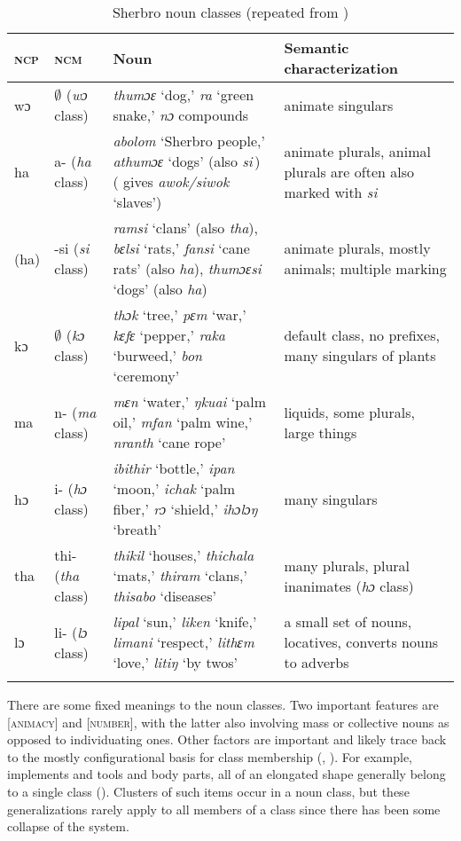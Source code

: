 \begin{table}
\caption{\label{tab:nounclass:31}Sherbro noun classes (repeated from )}
\small
\begin{tabularx}{\textwidth}{llQQ}
\lsptoprule
\textsc{ncp} & \textsc{ncm} & Noun & Semantic characterization\\
\midrule
 wɔ & $\emptyset$ (\textit{wɔ} class) & \textit{thumɔɛ} ‘dog,' \textit{ra} ‘green snake,' \textit{nɔ} compounds & animate singulars\\
 ha & a- (\textit{ha} class) & \textit{abolom} ‘Sherbro people,' \textit{athumɔɛ} ‘dogs' (also \textit{si}\,) (\citet{Sumner1921} gives \textit{awok/siwok} ‘slaves') & animate plurals, animal plurals are often also marked with \textit{si}\\
 (ha) & {}-si (\textit{si} class) & \textit{ramsi} ‘clans' (also \textit{tha}), \textit{bɛlsi} ‘rats,' \textit{fansi} ‘cane rats' (also \textit{ha}), \textit{thumɔɛsi} ‘dogs' (also \textit{ha}) & animate plurals, mostly animals; multiple marking\\
 kɔ & $\emptyset$ (\textit{kɔ} class) & \textit{thɔk} ‘tree,' \textit{pɛm} ‘war,' \textit{kɛfɛ} ‘pepper,' \textit{raka} ‘burweed,' \textit{bon} ‘ceremony' & default class, no prefixes, many singulars of plants\\
 ma & n- (\textit{ma} class) & \textit{mɛn} ‘water,' \textit{ŋkuai} ‘palm oil,' \textit{mfan} ‘palm wine,' \textit{nranth} ‘cane rope' & liquids, some plurals, large things\\
 hɔ & i- (\textit{hɔ} class) & \textit{ibithir} ‘bottle,' \textit{ipan} ‘moon,' \textit{ichak} ‘palm fiber,' \textit{rɔ} ‘shield,' \textit{ihɔlɔŋ} ‘breath' & many singulars\\
 tha & thi- (\textit{tha} class) & \textit{thikil} ‘houses,' \textit{thichala} ‘mats,' \textit{thiram} ‘clans,' \textit{thisabo} ‘diseases' & many plurals, plural inanimates (\textit{hɔ} class)\\
 lɔ & li- (\textit{lɔ} class) & \textit{lipal} ‘sun,' \textit{liken} ‘knife,' \textit{limani} ‘respect,' \textit{lithɛm} ‘love,' \textit{litiŋ} ‘by twos' & a small set of nouns, locatives, converts nouns to adverbs\\
\lspbottomrule
\end{tabularx}
\end{table}

There are some fixed meanings to the noun classes. Two important features are [\textsc{animacy}] and [\textsc{number}], with the latter also involving mass or collective nouns as opposed to individuating ones. Other factors are important and likely trace back to the mostly configurational basis for class membership (\citealt{CreiderDenny1975}, \citealt{DennyCreider1986}). For example, implements and tools and body parts, all of an elongated shape generally belong to a single class (\citealt{Childs1983}). Clusters of such items occur in a noun class, but these generalizations rarely apply to all members of a class since there has been some collapse of the system.

